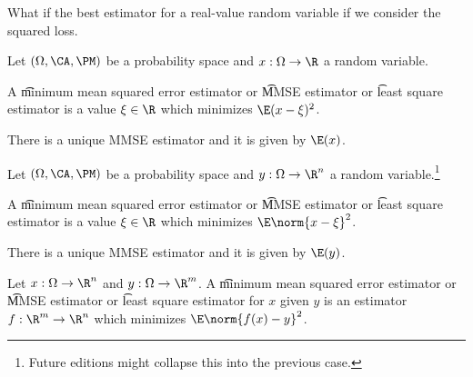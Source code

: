 

What if the best estimator for a real-value random variable if we consider the squared loss.


Let $(\Omega, \CA, \PM)$ be a probability space and $x: \Omega \to \R$ a random variable.

A \t{minimum mean squared error estimator} or \t{MMSE estimator} or \t{least square estimator} is a value $\xi \in \R$ which minimizes $\E (x - \xi)^2$.

\begin{proposition}
  There is a unique MMSE estimator and it is given by $\E(x)$.
\end{proposition}


Let $(\Omega, \CA, \PM)$ be a probability space and $y: \Omega \to \R^n$ a random variable.\footnote{Future editions might collapse this into the previous case.}

A \t{minimum mean squared error estimator} or \t{MMSE estimator} or \t{least square estimator} is a value $\xi \in \R$ which minimizes $\E \norm{x - \xi}^2$.

\begin{proposition}
  There is a unique MMSE estimator and it is given by $\E(y)$.
\end{proposition}

Let $x:\Omega\to\R^n$ and $y: \Omega \to \R^m$.
A \t{minimum mean squared error estimator} or \t{MMSE estimator} or \t{least square estimator} for $x$ given $y$ is an estimator $f: \R^m \to \R^n$ which minimizes $\E \norm{f(x) - y}^2$.


\blankpage
